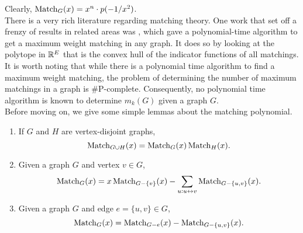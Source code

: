 	Clearly, $\operatorname{Match}_G(x) = x^n \cdot p(-1/x^2)$.\\

	There is a very rich literature regarding matching theory. One work that set off a frenzy of results in related areas was \cite{Edmonds1965MaximumMA}, which gave a polynomial-time algorithm to get a maximum weight matching in any graph. It does so by looking at the polytope in $\mathbb{R}^{E}$ that is the convex hull of the indicator functions of all matchings.
	It is worth noting that while there is a polynomial time algorithm to find a maximum weight matching, the problem of determining the number of maximum matchings in a graph is \textsf{\#P}-complete. Consequently, no polynomial time algorithm is known to determine $m_k(G)$ given a graph $G$.\\

	Before moving on, we give some simple lemmas about the matching polynomial.
	\begin{flem}
		\label{lem: matching polynomial basic results}
		\phantom{pain}
		\begin{enumerate}[label=(\alph*)]
			\item If $G$ and $H$ are vertex-disjoint graphs,
			\[ \operatorname{Match}_{G \cup H}(x) = \operatorname{Match}_G(x) \operatorname{Match}_H(x). \]
			\item Given a graph $G$ and vertex $v \in G$,
			\[ \operatorname{Match}_G(x) = x \operatorname{Match}_{G - \{v\}}(x) - \sum_{u : u \leftrightarrow v} \operatorname{Match}_{G - \{u,v\}} (x). \]
			\item Given a graph $G$ and edge $e = \{u,v\} \in G$,
			\[ \operatorname{Match}_G(x) = \operatorname{Match}_{G-e}(x) - \operatorname{Match}_{G-\{u,v\}}(x). \]
		\end{enumerate}
	\end{flem}
